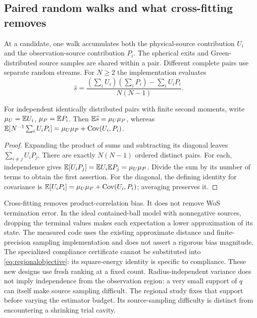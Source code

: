 \subsection{Paired random walks and what cross-fitting removes}
At a candidate, one walk accumulates both the physical-source
contribution $U_i$ and the observation-source contribution $P_i$.
The spherical exits and Green-distributed source samples are shared
within a pair. Different complete pairs use separate random streams.
For $N\geq2$ the implementation evaluates
\begin{equation}
 \widehat s=\frac{(\sum_iU_i)(\sum_iP_i)-\sum_iU_iP_i}{N(N-1)}.
 \label{eq:regionalcross}
\end{equation}
\begin{proposition}
For independent identically distributed pairs with finite second
moments, write $\mu_U=\mathbb{E} U_i$, $\mu_P=\mathbb{E} P_i$. Then
$\mathbb{E}\widehat s=\mu_U\mu_P$, whereas
$\mathbb{E}[N^{-1}\sum_i U_iP_i]=\mu_U\mu_P+\operatorname{Cov}(U_i,P_i)$.
\end{proposition}
\begin{proof}
Expanding the product of sums and subtracting its diagonal leaves
$\sum_{i\ne j}U_iP_j$. There are exactly $N(N-1)$ ordered distinct
pairs. For each, independence gives
$\mathbb{E}[U_iP_j]=\mathbb{E} U_i\mathbb{E} P_j=\mu_U\mu_P$. Divide the sum by its
number of terms to obtain the first assertion. For the diagonal,
the defining identity for covariance is
$\mathbb{E}[U_iP_i]=\mu_U\mu_P+\operatorname{Cov}(U_i,P_i)$; averaging preserves it.
\end{proof}
Cross-fitting removes product-correlation bias. It does not remove
WoS termination error. In the ideal contained-ball model with
nonnegative sources, dropping the terminal values makes each
expectation a lower approximation of its state. The measured code
uses the existing approximate distance and finite-precision sampling
implementation and does not assert a rigorous bias magnitude.
The specialized compliance certificate cannot be substituted into
\cref{eq:regionalobjective}: its square-energy identity is specific
to compliance. These new designs use fresh ranking at a fixed count.
Radius-independent variance does not imply independence from the
observation region: a very small support of $q$ can itself make source
sampling difficult. The regional study fixes that support before varying
the estimator budget. Its source-sampling difficulty is distinct from
encountering a shrinking trial cavity.

